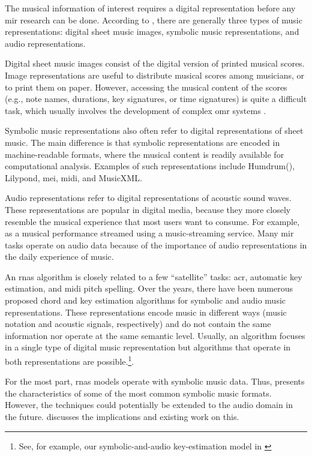 


The musical information of interest requires a digital
representation before any \gls{mir} research can be done.
According to \textcite{muller2015music}, there are generally
three types of music representations: digital sheet music
images, symbolic music representations, and audio
representations.

Digital sheet music images consist of the digital version of
printed musical scores. Image representations are useful to
distribute musical scores among musicians, or to print them
on paper. However, accessing the musical content of the
scores (e.g., note names, durations, key signatures, or time
signatures) is quite a difficult task, which usually
involves the development of complex \gls{omr} systems
\parencite{calvozaragoza2020understanding}.

Symbolic music representations also often refer to digital
representations of sheet music. The main difference is that
symbolic representations are encoded in machine-readable
formats, where the musical content is readily available for
computational analysis. Examples of such representations
include Humdrum(), Lilypond, \gls{mei},
\gls{midi}, and MusicXML.

Audio representations refer to digital representations of
acoustic sound waves. These representations are popular in
digital media, because they more closely resemble the
musical experience that most users want to consume. For
example, as a musical performance streamed using a
music-streaming service. Many \gls{mir} tasks operate on
audio data because of the importance of audio
representations in the daily experience of music.

An \glspl{rna} algorithm is closely related to a few
``satellite'' tasks: \gls{acr}, automatic key estimation,
and \gls{midi} pitch spelling. Over the years, there have
been numerous proposed chord and key estimation algorithms
for symbolic and audio music representations. These
representations encode music in different ways (music
notation and acoustic signals, respectively) and do not
contain the same information nor operate at the same
semantic level. Usually, an algorithm focuses in a single
type of digital music representation but algorithms that
operate in both representations are possible.\footnote{See, for example, our symbolic-and-audio key-estimation model in \textcite{napoleslopez2019keyfinding}}.

For the most part, \glspl{rna} models operate with symbolic
music data. Thus,  presents
the characteristics of some of the most common symbolic
music formats. However, the techniques could potentially be
extended to the audio domain in the future.
 discusses the
implications and existing work on this.

